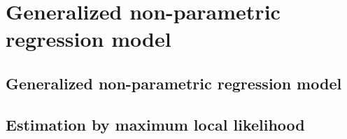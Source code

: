 \chapter{Generalized non-parametric regression model}

\section{Generalized non-parametric regression model}
\section{Estimation by maximum local likelihood}
